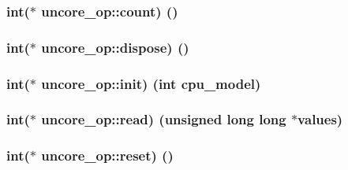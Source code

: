 \subsubsection[{\texorpdfstring{count}{count}}]{\setlength{\rightskip}{0pt plus 5cm}int($\ast$ uncore\+\_\+op\+::count) ()}\hypertarget{structuncore__op_a18b27fb33f2be6c8c70111ba05cc46f8}{}\label{structuncore__op_a18b27fb33f2be6c8c70111ba05cc46f8}
\subsubsection[{\texorpdfstring{dispose}{dispose}}]{\setlength{\rightskip}{0pt plus 5cm}int($\ast$ uncore\+\_\+op\+::dispose) ()}\hypertarget{structuncore__op_a6f01675c13274c88ded83d277f48d451}{}\label{structuncore__op_a6f01675c13274c88ded83d277f48d451}
\subsubsection[{\texorpdfstring{init}{init}}]{\setlength{\rightskip}{0pt plus 5cm}int($\ast$ uncore\+\_\+op\+::init) (int {\bf cpu\+\_\+model})}\hypertarget{structuncore__op_a8a3c691983021d4ec3df44316b9a9e00}{}\label{structuncore__op_a8a3c691983021d4ec3df44316b9a9e00}
\subsubsection[{\texorpdfstring{read}{read}}]{\setlength{\rightskip}{0pt plus 5cm}int($\ast$ uncore\+\_\+op\+::read) (unsigned long long $\ast${\bf values})}\hypertarget{structuncore__op_ad2df8248f66329c66239d33ee5456456}{}\label{structuncore__op_ad2df8248f66329c66239d33ee5456456}
\subsubsection[{\texorpdfstring{reset}{reset}}]{\setlength{\rightskip}{0pt plus 5cm}int($\ast$ uncore\+\_\+op\+::reset) ()}\hypertarget{structuncore__op_af676de4c6eba45a665865061cdc74072}{}\label{structuncore__op_af676de4c6eba45a665865061cdc74072}
